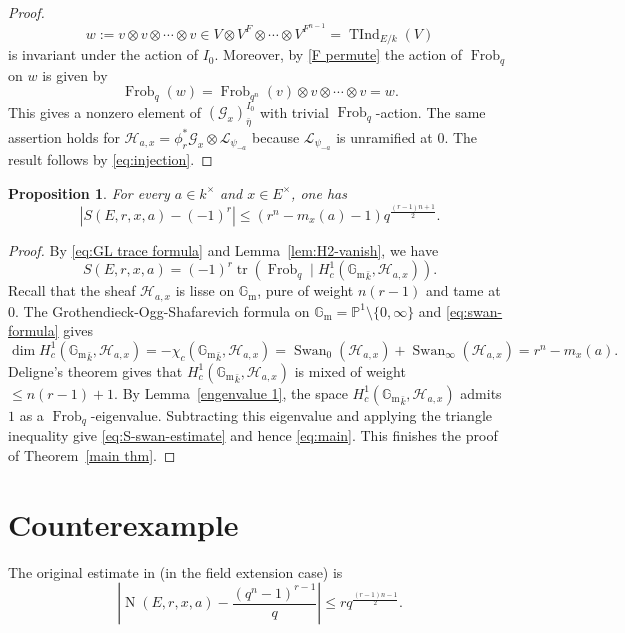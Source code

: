 \documentclass[11pt]{amsart}
\newtheorem{proposition}[theorem]{Proposition}
\theoremstyle{remark}
\newcommand{\Gm}{\mathbb G_{\mathrm m}}
\newcommand{\Pj}{\mathbb P}
\newcommand{\Frob}{\operatorname{Frob}}
\newcommand{\Swan}{\operatorname{Swan}}
\newcommand{\TInd}{\operatorname{TInd}}
\newcommand{\cL}{\mathcal L}
\newcommand{\cG}{\mathcal G}
\newcommand{\cH}{\mathcal H}
\newcommand{\Nm}{\operatorname{N}}
\begin{document}
\begin{proof}
\[
w:=v\otimes v\otimes\cdots\otimes v\in V \otimes V^F \otimes \cdots \otimes V^{F^{n-1}}=\TInd_{E/k}(V)
\]
is invariant under the action of $I_0$. Moreover, by \eqref{F permute} the action of $\Frob_q$ on $w$ is given by
\[
\Frob_q(w)=\Frob_{q^n}(v)\otimes v\otimes\cdots\otimes v=w.
\]
This gives a nonzero element of $(\cG_x)_{\bar{\eta}}^{I_0}$ with trivial $\Frob_q$-action. The same assertion holds for $\cH_{a,x}=\phi_r^*\cG_x\otimes\cL_{\psi_{-a}}$ because $\cL_{\psi_{-a}}$ is unramified at $0$. The result follows by \eqref{eq:injection}.
\end{proof}

\begin{proposition}\label{prop:S-swan-estimate}
For every $a\in k^{\times}$ and $x\in E^{\times}$, one has
\begin{equation}\label{eq:S-swan-estimate}
\left|S(E,r,x,a)-(-1)^r\right|\le \left(r^n-m_x(a)-1\right)q^{\frac{(r-1)n+1}{2}}.
\end{equation}
\end{proposition}

\begin{proof}
By \eqref{eq:GL trace formula} and Lemma~\ref{lem:H2-vanish}, we have 
\[
S(E,r,x,a)=(-1)^r\operatorname{tr}\left(\Frob_q\mid H_c^1({\Gm}_{\bar{k}},\cH_{a,x})\right).
\]
Recall that the sheaf $\cH_{a,x}$ is lisse on $\Gm$, pure of weight $n(r-1)$ and tame at $0$. The Grothendieck-Ogg-Shafarevich formula on
$\Gm=\Pj^1\setminus\{0,\infty\}$ and \eqref{eq:swan-formula} gives
\[
\dim H_c^1({\Gm}_{\bar{k}},\cH_{a,x})=-\chi_c({\Gm}_{\bar{k}},\cH_{a,x})=\Swan_0(\cH_{a,x})+\Swan_\infty(\cH_{a,x})=r^n-m_x(a).
\]
Deligne's theorem gives that $H_c^1({\Gm}_{\bar{k}},\cH_{a,x})$ is mixed of weight $\le n(r-1)+1$. By Lemma~\ref{engenvalue 1}, the space $H_c^1({\Gm}_{\bar{k}},\cH_{a,x})$ admits $1$ as a $\Frob_q$-eigenvalue. Subtracting this eigenvalue and applying the triangle inequality give \eqref{eq:S-swan-estimate} and hence \eqref{eq:main}. This finishes the proof of Theorem~\ref{main thm}.
\end{proof}

\section{Counterexample}\label{counterexample}
The original estimate in \cite[Conjecture 4.3]{WanNormTrace} (in the field extension case) is
\begin{equation}\label{Wan-conj}
\left|\Nm(E,r,x,a)-\frac{(q^n-1)^{r-1}}{q}\right|
\le r q^{\frac{(r-1)n-1}{2}}.
\end{equation}
\end{document}
